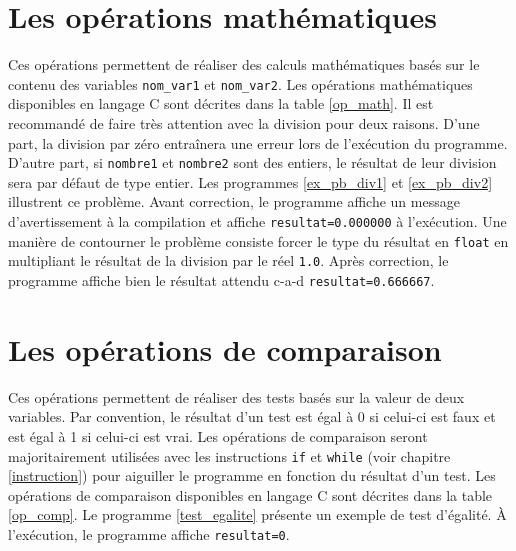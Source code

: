 \documentclass[a4paper,11pt]{book}
\theoremstyle{definition}
\begin{document}
\section{Les opérations mathématiques}

Ces opérations permettent de réaliser des calculs mathématiques
basés sur le contenu des variables \texttt{nom\_var1} et
\texttt{nom\_var2}. Les opérations mathématiques disponibles en
langage C sont décrites dans la table \ref{op_math}. Il est
recommandé de faire très attention avec la division pour deux
raisons. D'une part, la division par zéro entraînera une erreur
lors de l'exécution du programme. D'autre part, si
\texttt{nombre1} et \texttt{nombre2} sont des entiers, le résultat
de leur division sera par défaut de type entier. Les programmes
\ref{ex_pb_div1} et \ref{ex_pb_div2} illustrent ce problème. Avant
correction, le programme affiche un message d'avertissement à la
compilation et affiche \texttt{resultat=0.000000} à l'exécution.
Une manière de contourner le problème consiste forcer le type du
résultat en \texttt{float} en multipliant le résultat de la
division par le réel \texttt{1.0}. Après correction, le programme
affiche bien le résultat attendu c-a-d \texttt{resultat=0.666667}. 






\section{Les opérations de comparaison}
\label{sec_comp} Ces opérations permettent de réaliser des tests
basés sur la valeur de deux variables. Par convention, le résultat d'un test est égal à
0 si celui-ci est faux et est égal à 1 si celui-ci est vrai. Les
opérations de comparaison seront majoritairement utilisées avec
les instructions \texttt{if} et \texttt{while} (voir chapitre
\ref{instruction}) pour aiguiller le programme en fonction du
résultat d'un test. Les opérations de comparaison disponibles en
langage C sont décrites dans la table \ref{op_comp}. Le programme \ref{test_egalite} présente un exemple
de test d'égalité. \`A l'exécution, le programme affiche
\texttt{resultat=0}.


\end{document}
